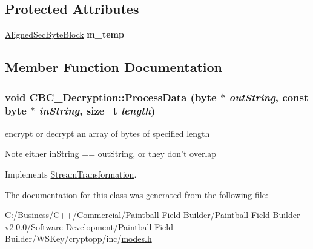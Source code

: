 \subsection*{Protected Attributes}
\begin{DoxyCompactItemize}
\item 
\hypertarget{class_c_b_c___decryption_ac909ac234ee12c41ec1c1f71dc8edb11}{
\hyperlink{class_sec_block}{AlignedSecByteBlock} {\bfseries m\_\-temp}}
\label{class_c_b_c___decryption_ac909ac234ee12c41ec1c1f71dc8edb11}

\end{DoxyCompactItemize}


\subsection{Member Function Documentation}
\hypertarget{class_c_b_c___decryption_ad3dfde8d73d036dc144e8750a6a3b1d1}{
\subsubsection[{ProcessData}]{\setlength{\rightskip}{0pt plus 5cm}void CBC\_\-Decryption::ProcessData (byte $\ast$ {\em outString}, \/  const byte $\ast$ {\em inString}, \/  size\_\-t {\em length})}}
\label{class_c_b_c___decryption_ad3dfde8d73d036dc144e8750a6a3b1d1}


encrypt or decrypt an array of bytes of specified length \begin{DoxyNote}{Note}
either inString == outString, or they don't overlap 
\end{DoxyNote}


Implements \hyperlink{class_stream_transformation_a26feabde21bc4d1783195969733e3bb0}{StreamTransformation}.

The documentation for this class was generated from the following file:\begin{DoxyCompactItemize}
\item 
C:/Business/C++/Commercial/Paintball Field Builder/Paintball Field Builder v2.0.0/Software Development/Paintball Field Builder/WSKey/cryptopp/inc/\hyperlink{modes_8h}{modes.h}\end{DoxyCompactItemize}
